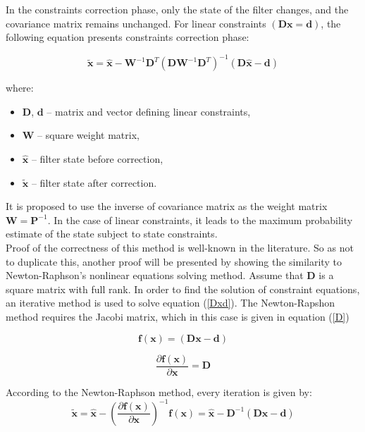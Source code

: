 In the constraints correction phase, only the state of the filter changes, and the covariance matrix remains unchanged. For linear constraints $\left( \bm{D} \bm{x} = \bm{d}  \right)$, the following equation presents constraints correction phase:

\begin{equation}
	\bm{\tilde{x}} = \bm{\hat{x}} - \bm{W}^{-1} \bm{D}^T \left( \bm{D} \bm{W}^{-1} \bm{D}^T \right)^{-1} \left( \bm{D} \bm{\hat{x}} - \bm{d}  \right)
	\label{constraint_corr}
\end{equation}

where:
\begin{itemize}[noitemsep]
	\item $\bm{D}$, $\bm{d}$ -- matrix and vector defining linear constraints,
	\item $\bm{W}$ -- square weight matrix,
	\item $\bm{\hat{x}}$ -- filter state before correction,
	\item $\bm{\tilde{x}}$ -- filter state after correction.
\end{itemize}

It is proposed to use the inverse of covariance matrix as the weight matrix  $\bm{W} = \bm{P}^{-1}$. In the case of linear constraints, it leads to the maximum probability
estimate of the state subject to state constraints.\\

Proof of the correctness of this method is well-known in the literature. So as not to duplicate this, another proof will be presented by showing the similarity to Newton-Raphson's nonlinear equations solving method. Assume that $\bm{D}$ is a square matrix with full rank. In order to find the solution of constraint equations, an iterative method is used to solve equation (\ref{Dxd}). The Newton-Rapshon method requires the Jacobi matrix, which in this case is given in equation (\ref{D})

\begin{equation}
	\bm{f} \left( \bm{x} \right) = \left( \bm{D} \bm{x} - \bm{d}  \right)
	\label{Dxd}
\end{equation}

\begin{equation}
	\frac{\partial \bm{f} \left( \bm{x} \right)}{\partial \bm{x}} = \bm{D}
	\label{D}
\end{equation}

According to the Newton-Raphson method, every iteration is given by:
\begin{equation}
	\bm{\tilde{x}} = \bm{\hat{x}} - \left( \frac{\partial \bm{f} \left( \bm{x} \right)}{\partial \bm{x}} \right) ^{-1} \bm{f} \left( \bm{x} \right) = \bm{\hat{x}} - \bm{D}^{-1} \left( \bm{D} \bm{\hat{x}} - \bm{d}  \right)
	\label{NR}
\end{equation}

